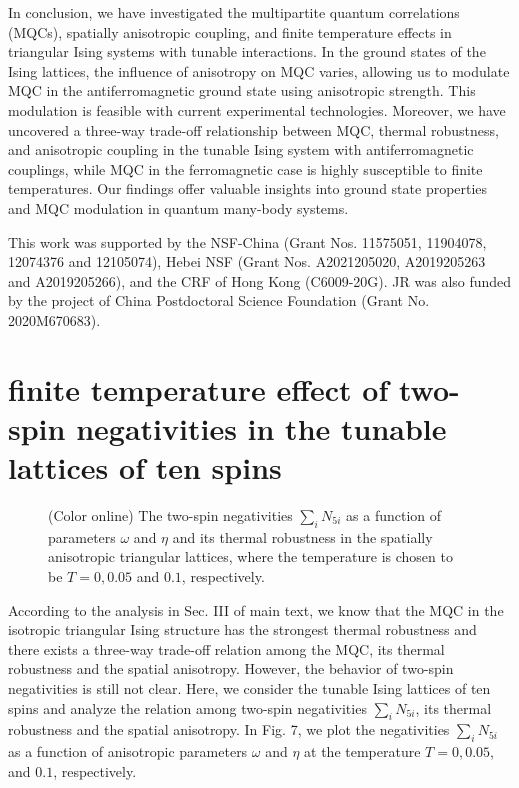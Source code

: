 \documentclass[pra,aps,twocolumn,showpacs]{revtex4}
\begin{document}
In conclusion, we have investigated the multipartite quantum correlations (MQCs), spatially anisotropic coupling, and finite temperature effects in triangular Ising systems with tunable interactions. In the ground states of the Ising lattices, the influence of anisotropy on MQC varies, allowing us to modulate MQC in the antiferromagnetic ground state using anisotropic strength. This modulation is feasible with current experimental technologies. Moreover, we have uncovered a three-way trade-off relationship between MQC, thermal robustness, and anisotropic coupling in the tunable Ising system with antiferromagnetic couplings, while MQC in the ferromagnetic case is highly susceptible to finite temperatures. Our findings offer valuable insights into ground state properties and MQC modulation in quantum many-body systems.

\begin{acknowledgments}
This work was supported by the NSF-China (Grant Nos. 11575051, 11904078, 12074376 and 12105074), Hebei NSF (Grant Nos. A2021205020, A2019205263 and A2019205266), and the CRF of Hong Kong (C6009-20G). JR was also funded by the project of China Postdoctoral Science Foundation (Grant No. 2020M670683).
\end{acknowledgments}


\appendix

\section{finite temperature effect of two-spin negativities in the tunable lattices of ten spins}

\begin{figure}
	\caption{(Color online) The two-spin negativities $\sum_i N_{5i}$ as a function of parameters $\omega$ and $\eta$ and its thermal robustness in the spatially anisotropic triangular lattices, where the temperature is chosen to be $T=0, 0.05$ and $0.1$, respectively.}
\end{figure}

According to the analysis in Sec. III of main text, we know that the MQC in the isotropic triangular Ising structure has the strongest thermal robustness and there exists a three-way trade-off relation among the MQC, its thermal robustness and the spatial anisotropy. However, the behavior of two-spin negativities is still not clear. Here, we consider the tunable Ising lattices of ten spins and analyze the relation among two-spin negativities $\sum_i N_{5i}$, its thermal robustness and the spatial anisotropy. In Fig. 7, we plot the negativities $\sum_i N_{5i}$ as a function of anisotropic parameters $\omega$ and $\eta$ at the temperature $T=0, 0.05$, and $0.1$, respectively.
\end{document}

